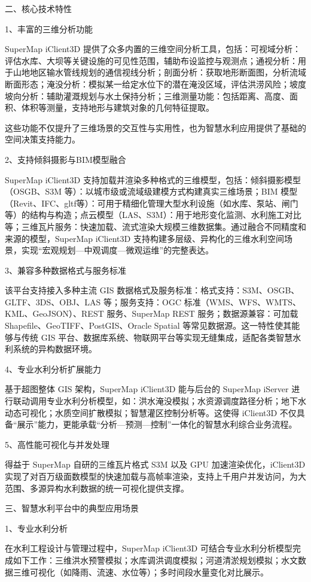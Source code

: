 二、核心技术特性

1、丰富的三维分析功能

SuperMap iClient3D 提供了众多内置的三维空间分析工具，包括：可视域分析：评估水库、大坝等关键设施的可见性范围，辅助布设监控与观测点；通视分析：用于山地地区输水管线规划的通信视线分析；剖面分析：获取地形断面图，分析流域断面形态；淹没分析：模拟某一给定水位下的潜在淹没区域，评估洪涝风险；坡度坡向分析：辅助灌溉规划与水土保持分析；三维测量功能：包括距离、高度、面积、体积等测量，支持地形与建筑对象的几何特征提取。

这些功能不仅提升了三维场景的交互性与实用性，也为智慧水利应用提供了基础的空间决策支持能力。

2、支持倾斜摄影与BIM模型融合

SuperMap iClient3D 支持加载并渲染多种格式的三维模型，包括：倾斜摄影模型（OSGB、S3M 等）：以城市级或流域级建模方式构建真实三维场景；BIM 模型（Revit、IFC、gltf等）：可用于精细化管理大型水利设施（如水库、泵站、闸门等）的结构与构造；点云模型（LAS、S3M）：用于地形变化监测、水利施工对比等；三维瓦片服务：快速加载、流式渲染大规模三维数据集。通过融合不同精度和来源的模型，SuperMap iClient3D 支持构建多层级、异构化的三维水利空间场景，实现``宏观规划---中观调度---微观运维''的完整表达。

3、兼容多种数据格式与服务标准

该平台支持接入多种主流 GIS 数据格式及服务标准：格式支持：S3M、OSGB、GLTF、3DS、OBJ、LAS 等；服务支持：OGC 标准（WMS、WFS、WMTS、KML、GeoJSON）、REST 服务、SuperMap REST 服务；数据源兼容：可加载 Shapefile、GeoTIFF、PostGIS、Oracle Spatial 等常见数据源。这一特性使其能够与传统 GIS 平台、数据库系统、物联网平台等实现无缝集成，适配各类智慧水利系统的异构数据环境。

4、专业水利分析扩展能力

基于超图整体 GIS 架构，SuperMap iClient3D 能与后台的 SuperMap iServer 进行联动调用专业水利分析模型，如：洪水淹没模拟；水资源调度路径分析；地下水动态可视化；水质空间扩散模拟；智慧灌区控制分析等。这使得 iClient3D 不仅具备``展示''能力，更能承载``分析---预测---控制''一体化的智慧水利综合业务流程。

5、高性能可视化与并发处理

得益于 SuperMap 自研的三维瓦片格式 S3M 以及 GPU 加速渲染优化，iClient3D 实现了对百万级面数模型的快速加载与高帧率渲染，支持上千用户并发访问，为大范围、多源异构水利数据的统一可视化提供支撑。

三、智慧水利平台中的典型应用场景

1、专业水利分析

在水利工程设计与管理过程中，SuperMap iClient3D 可结合专业水利分析模型完成如下工作：三维洪水预警模拟；水库调洪调度模拟；河道清淤规划模拟；水文数据三维可视化（如降雨、流速、水位等）；多时间段水量变化对比展示。

